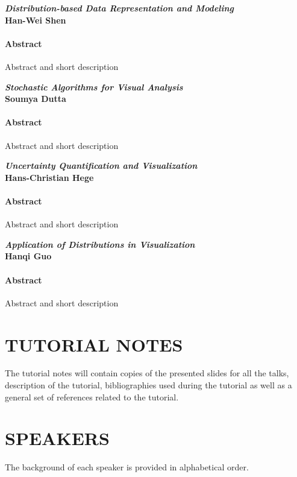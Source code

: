 \documentclass[preprint,journal]{vgtc}       %
\newcommand{\addverticalspace}{\vspace{3mm}}
\begin{document}
\noindent\textbf{\textit{Distribution-based Data Representation and Modeling}}\\
\textbf{Han-Wei Shen}
\paragraph{Abstract}
Abstract and short description

\addverticalspace

\noindent\textbf{\textit{Stochastic Algorithms for Visual Analysis}}\\
\textbf{Soumya Dutta}
\paragraph{Abstract}
Abstract and short description

\addverticalspace

\noindent\textbf{\textit{Uncertainty Quantification and Visualization}}\\
\textbf{Hans-Christian Hege}
\paragraph{Abstract}
Abstract and short description

\addverticalspace

\noindent\textbf{\textit{Application of Distributions in Visualization}}\\
\textbf{Hanqi Guo}
\paragraph{Abstract}
Abstract and short description

\addverticalspace

\section*{TUTORIAL NOTES}

The tutorial notes will contain copies of the presented slides for all the talks, description of the tutorial,  bibliographies used during the tutorial as well as a general set of references related to the tutorial.

\section*{SPEAKERS}
The background of each speaker is provided in alphabetical order.

\addverticalspace
\end{document}
